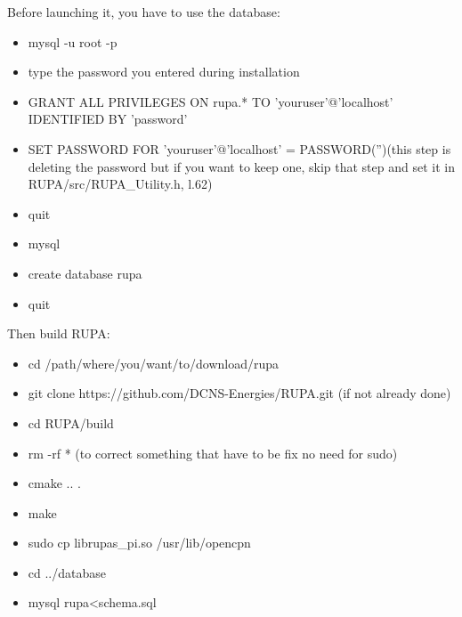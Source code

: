 \documentclass[11pt]{report}
\begin{document}

        \vspace{3cm}
            Before launching it, you have to use the database:
            \begin{itemize}
                \item mysql -u root -p
                \item type the password you entered during installation
                \item GRANT ALL PRIVILEGES ON rupa.* TO 'youruser'@'localhost' IDENTIFIED BY 'password' 
                \item SET PASSWORD FOR 'youruser'@'localhost' = PASSWORD('')(this step is deleting the password but if you want to keep one, skip that step and set it in RUPA/src/RUPA\_Utility.h, l.62)
                \item quit
                \item mysql
                \item create database rupa
                \item quit
            \end{itemize}

        \vspace{3cm}
            Then build RUPA:
            \begin{itemize}
                \item cd /path/where/you/want/to/download/rupa
                \item git clone https://github.com/DCNS-Energies/RUPA.git (if not already done)
                \item cd RUPA/build
                \item rm -rf * (to correct something that have to be fix no need for sudo)
                \item cmake .. .
                \item make
                \item sudo cp librupas\_pi.so /usr/lib/opencpn
                \item cd ../database
                \item mysql rupa<schema.sql
            \end {itemize}
            
\end{document}
